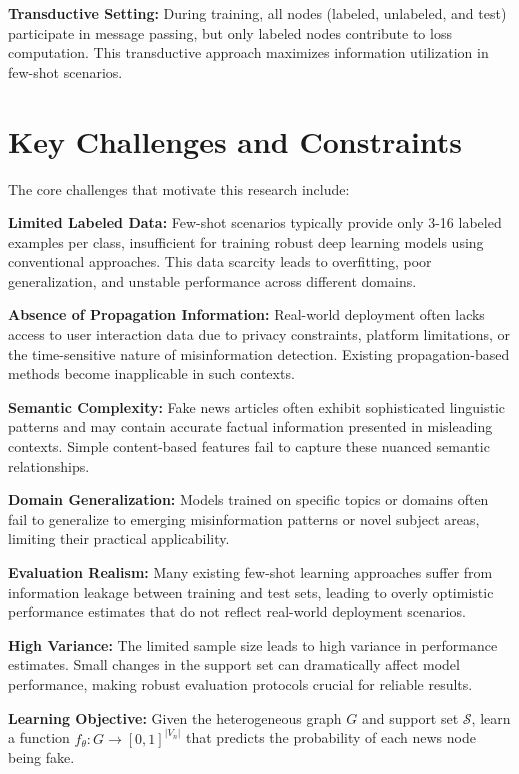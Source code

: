 \textbf{Transductive Setting:} During training, all nodes (labeled, unlabeled, and test) participate in message passing, but only labeled nodes contribute to loss computation. This transductive approach maximizes information utilization in few-shot scenarios.

\section{Key Challenges and Constraints}

The core challenges that motivate this research include:

\textbf{Limited Labeled Data:} Few-shot scenarios typically provide only 3-16 labeled examples per class, insufficient for training robust deep learning models using conventional approaches. This data scarcity leads to overfitting, poor generalization, and unstable performance across different domains.

\textbf{Absence of Propagation Information:} Real-world deployment often lacks access to user interaction data due to privacy constraints, platform limitations, or the time-sensitive nature of misinformation detection. Existing propagation-based methods become inapplicable in such contexts.

\textbf{Semantic Complexity:} Fake news articles often exhibit sophisticated linguistic patterns and may contain accurate factual information presented in misleading contexts. Simple content-based features fail to capture these nuanced semantic relationships.

\textbf{Domain Generalization:} Models trained on specific topics or domains often fail to generalize to emerging misinformation patterns or novel subject areas, limiting their practical applicability.

\textbf{Evaluation Realism:} Many existing few-shot learning approaches suffer from information leakage between training and test sets, leading to overly optimistic performance estimates that do not reflect real-world deployment scenarios.

\textbf{High Variance:} The limited sample size leads to high variance in performance estimates. Small changes in the support set can dramatically affect model performance, making robust evaluation protocols crucial for reliable results.

\textbf{Learning Objective:} Given the heterogeneous graph $G$ and support set $\mathcal{S}$, learn a function $f_{\theta}: G \rightarrow [0,1]^{|V_n|}$ that predicts the probability of each news node being fake.

